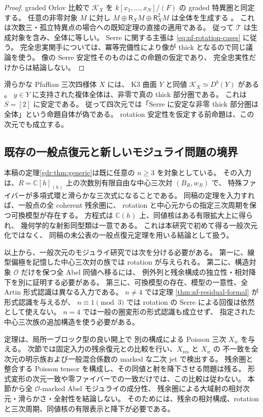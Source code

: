 \begin{proof}
graded Orlov 比較で $\mathcal K_X$ を
$k[x_1,\ldots,x_N]/(F)$ の graded 特異圏と同定する。
任意の非零対象 $M$ に対し
$M\oplus\mathsf R_XM\oplus\mathsf R_X^2M$ は全体を生成する
\cite[Theorem~5.15]{NFBFKOrlov}。
これは次数三・孤立特異点の場合への既知定理の直接の適用である。
従って $\mathcal T$ は生成対象を含み、全体に等しい。
Serre に関する主張は \eqref{eq:nf-rotation-cases} に従う。
完全忠実関手については、冪等完備性により像が thick となるので同じ議論を使う。
像の Serre 安定性そのものはこの命題の仮定であり、
完全忠実性だけからは結論しない。
\end{proof}

\begin{remark}
\label{rem:nf-serre-insufficient}
滑らかな Pfaffian 三次四様体 $X$ には、
K3 曲面 $Y$ と同値 $\mathcal K_X\simeq D^b(Y)$ がある
\cite[Theorem~3.1]{NFKuznetsovCubicFourfolds}。
$y\in Y$ に支持された複体全体は、非零で真の thick 部分圏である。
これは $S=[2]$ に安定である。
従って四次元では「Serre に安定な非零 thick 部分圏は全体」という命題自体が偽である。
rotation 安定性を仮定する前命題は、この次元でも成立する。
\end{remark}

\subsection{既存の一般点復元と新しいモジュライ問題の境界}

本稿の定理\ref{gdr:thm:generic}は既に任意の $n\geq3$ を対象としている。
その入力は、$R=\mathbb C[h]_{(h)}$ 上の次数別有限自由な中心三次対
$(B_R,w_R)$ で、
特殊ファイバーが多項式環と滑らかな三次式になることである。
同稿の定理を入力すれば、一般点の全 coherent 残余圏に、
rotation と中心元からの指定三次周期を保つ可換模型が存在する。
方程式は $\mathbb C(h)$ 上、同値核はある有限拡大上に得られ、
幾何学的な射影同型類は一意である。
これは本研究で初めて得る一般次元化ではなく、
同稿の未公表の一般点復元定理を用いる結論として扱う。

以上から、一般次元のモジュライ研究では次を分ける必要がある。
第一に、線型偏極を記憶した中心三次対の族では rotation が与えられる。
第二に、構造対象 $\mathcal O$ だけを保つ全 Abel 同値へ移るには、
例外列と残余構成の独立性・相対降下を別に証明する必要がある。
第三に、可換模型の存在、模型の一意性、全 Artin 形式認識は異なる入力である。
$n\neq4$ では定理 \ref{thm:nf-residual-formal} が形式認識を与えるが、
$n\equiv1\pmod3$ では rotation の Serre による回復は依然として使えない。
$n=4$ では一般の圏変形の形式認識も成立せず、
指定された中心三次族の追加構造を使う必要がある。

定理は、局所一ブロック型の良い開上で
別の構成による Poisson 三次 $X_w$ を与える。
次節では固定入力の残余復元との比較を行い、$X_{\mathrm{res}}$ と $X_w$ の
不一致を全次元の明示族および一般混合係数の marked な二次 jet で検出する。
残余圏と整合する Poisson tensor を構成し、その同値と射を降下させる問題は残る。
形式変形の次元一致や零ファイバーでの一致だけでは、この比較は従わない。
本節から全 $\mathcal O$-marked Abel モジュライの成分性、
残余圏による大域射の相対次元・滑らかさ・全射性を結論しない。
そのためには、残余の相対構成、rotation と三次周期、同値核の有限表示と降下が必要である。
